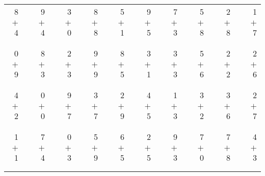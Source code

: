 \documentclass[12pt, letterpaper]{article}
\begin{document}
\begin{tabular}{rrrrrrrrrrrrrrrrrrr}
8 & & 9 & & 3 & & 8 & & 5 & & 9 & & 7 & & 5 & & 2 & & 1\\
$+$ 4 & & $+$ 4 & & $+$ 0 & & $+$ 8 & & $+$ 1 & & $+$ 5 & & $+$ 3 & & $+$ 8 & & $+$ 8 & & $+$ 7\\
\cline{1-1} \cline{3-3} \cline{5-5} \cline{7-7} \cline{9-9} \cline{11-11} \cline{13-13} \cline{15-15} \cline{17-17} \cline{19-19} \\ \\
0 & & 8 & & 2 & & 9 & & 8 & & 3 & & 3 & & 5 & & 2 & & 2\\
$+$ 9 & & $+$ 3 & & $+$ 3 & & $+$ 9 & & $+$ 5 & & $+$ 1 & & $+$ 3 & & $+$ 6 & & $+$ 2 & & $+$ 6\\
\cline{1-1} \cline{3-3} \cline{5-5} \cline{7-7} \cline{9-9} \cline{11-11} \cline{13-13} \cline{15-15} \cline{17-17} \cline{19-19} \\ \\
4 & & 0 & & 9 & & 3 & & 2 & & 4 & & 1 & & 3 & & 3 & & 2\\
$+$ 2 & & $+$ 0 & & $+$ 7 & & $+$ 7 & & $+$ 9 & & $+$ 5 & & $+$ 3 & & $+$ 2 & & $+$ 6 & & $+$ 7\\
\cline{1-1} \cline{3-3} \cline{5-5} \cline{7-7} \cline{9-9} \cline{11-11} \cline{13-13} \cline{15-15} \cline{17-17} \cline{19-19} \\ \\
1 & & 7 & & 0 & & 5 & & 6 & & 2 & & 9 & & 7 & & 7 & & 4\\
$+$ 1 & & $+$ 4 & & $+$ 3 & & $+$ 9 & & $+$ 5 & & $+$ 5 & & $+$ 3 & & $+$ 0 & & $+$ 8 & & $+$ 3\\
\cline{1-1} \cline{3-3} \cline{5-5} \cline{7-7} \cline{9-9} \cline{11-11} \cline{13-13} \cline{15-15} \cline{17-17} \cline{19-19} \\ \\
\end{tabular}
\newpage
\end{document}
